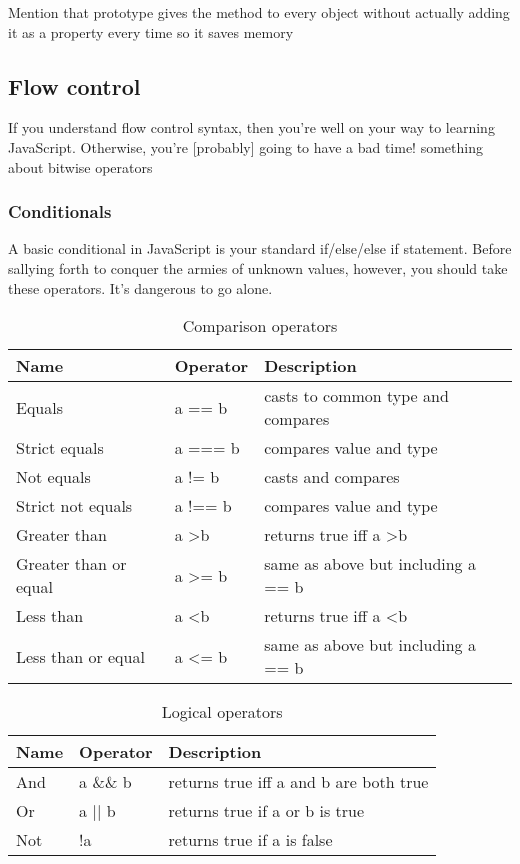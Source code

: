 \documentclass[12pt]{article}
\newcommand{\say}[1]{{\color{magenta} #1}}
\begin{document}
\say{Mention that prototype gives the method to every object without actually adding it as a property every time so it saves memory}

\subsection{Flow control}
If you understand flow control syntax, then you're well on your way to learning JavaScript. Otherwise, you're [probably] going to have a bad time!
\say{something about bitwise operators}
\subsubsection{Conditionals}
A basic conditional in JavaScript is your standard if/else/else if statement. Before sallying forth to conquer the armies of unknown values, however, you should take these operators. It's dangerous to go alone.
\begin{center}
\begin{table}[position=h]
\begin{tabular} {| l | l | l |}
\hline
\textbf{Name} & \textbf{Operator} & \textbf{Description} \\
\hline
Equals & a == b & casts to common type and compares \\
\hline
Strict equals & a === b & compares value and type \\
\hline
Not equals & a != b & casts and compares \\
\hline
Strict not equals & a !== b & compares value and type \\
\hline
Greater than & a \textgreater \space b & returns true iff a \textgreater \space b \\
\hline
Greater than or equal & a \textgreater= b & same as above but including a == b \\
\hline
Less than & a \textless \space b & returns true iff a \textless \space b \\
\hline
Less than or equal & a \textless= b & same as above but including a == b \\
\hline
\end{tabular}
\caption{Comparison operators}
\end{table}

\begin{table}[location=h]
\begin{tabular} {| l | l | l |}
\hline
\textbf{Name} & \textbf{Operator} & \textbf{Description} \\
\hline
And & a \&\& b & returns true iff a and b are both true \\
\hline
Or & a $||$ b & returns true if a or b is true \\
\hline
Not & !a & returns true if a is false \\
\hline
\end{tabular}
\caption{Logical operators}
\end{table}
\end{center}
\end{document}
